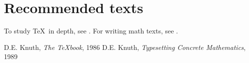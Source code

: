 \documentclass{article}
\begin{document}
\section*{Recommended texts}
To study \TeX\ in depth, see \cite{DK86}. For writing math texts,
see \cite{DK89}.
\begin{thebibliography}{Knuth89}
 D.E. Knuth, \emph{The {\TeX}book}, 1986
 D.E. Knuth, \emph{Typesetting Concrete
Mathematics}, 1989
\end{thebibliography}
\end{document}
